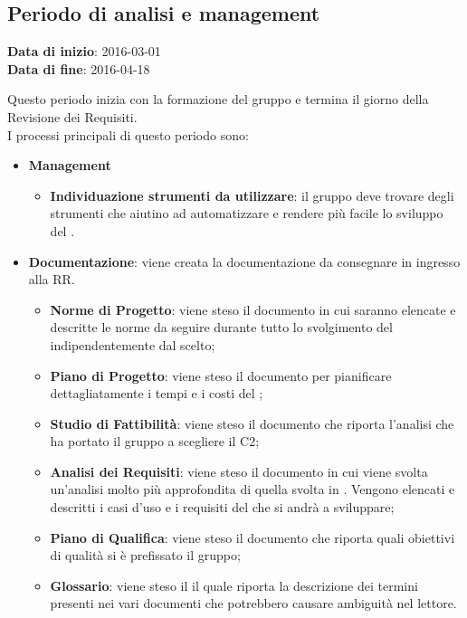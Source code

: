 	\subsection{Periodo di analisi e management}
	\begin{center}
		\textbf{Data di inizio}: 2016-03-01 \\
		\textbf{Data di fine}: 2016-04-18 \\
	\end{center}

	Questo periodo inizia con la formazione del gruppo e termina il giorno della Revisione dei Requisiti. \\
	I processi principali di questo periodo sono: 
	\begin{itemize}
		\item \textbf{Management}
			\att
			\begin{itemize} 
				\item \textbf{Individuazione strumenti da utilizzare}: il gruppo deve trovare degli strumenti che aiutino ad automatizzare e rendere più facile lo sviluppo del .
			\end{itemize}
		\item \textbf{Documentazione}: viene creata la documentazione da consegnare in ingresso alla RR.
		\att
		\begin{itemize}
			\item \textbf{Norme di Progetto}: viene steso il documento \NPdocRR{} in cui saranno elencate e descritte le norme da seguire durante tutto lo svolgimento del  indipendentemente dal  scelto; 
			\item \textbf{Piano di Progetto}: viene steso il documento \PPdocRR{} per pianificare dettagliatamente i tempi e i costi del ;
			\item \textbf{Studio di Fattibilità}: viene steso il documento \SFdocRR{} che riporta l'analisi che ha portato il gruppo a scegliere il  C2;
			\item \textbf{Analisi dei Requisiti}: viene steso il documento \ARdocRR{} in cui viene svolta un'analisi molto più approfondita di quella svolta in \SFdocRR. Vengono elencati e descritti i casi d'uso e i requisiti del  che si andrà a sviluppare;
			\item \textbf{Piano di Qualifica}: viene steso il documento \PQdocRR{} che riporta quali obiettivi di qualità si è prefissato il gruppo;
			\item \textbf{Glossario}: viene steso il \GldocRR{} il quale riporta la descrizione dei termini presenti nei vari documenti che potrebbero causare ambiguità nel lettore.
		\end{itemize}
	\end{itemize}
	
